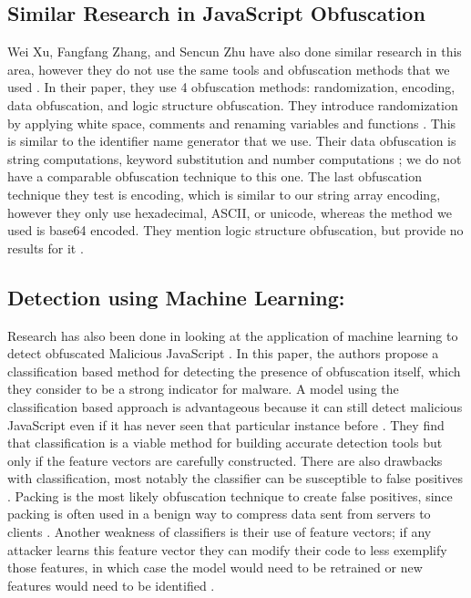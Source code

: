 \documentclass[sigplan,10pt,review, nonacm=true]{acmart}\settopmatter{printfolios=true,printccs=false,printacmref=false}
\begin{document}
\subsection{Similar Research in JavaScript Obfuscation}
Wei Xu, Fangfang Zhang, and Sencun Zhu have also done similar research in this area, however they do not use the same tools and obfuscation methods that we used \cite{XuZhang}. In their paper, they use 4 obfuscation methods: randomization, encoding, data obfuscation, and logic structure obfuscation.  They introduce randomization by applying white space, comments and renaming variables and functions \cite{XuZhang}. This is similar to the identifier name generator that we use. Their data obfuscation is string computations, keyword substitution and number computations \cite{XuZhang}; we do not have a comparable obfuscation technique to this one. The last obfuscation technique they test is encoding, which is similar to our string array encoding, however they only use hexadecimal, ASCII, or unicode, whereas the method we used is base64 encoded. They mention logic structure obfuscation, but provide no results for it \cite{XuZhang}.

\subsection{Detection using Machine Learning:}
Research has also been done in looking at the application of machine learning to detect obfuscated Malicious JavaScript \cite{Likarish}. In this paper, the authors propose a classification based method for detecting the presence of obfuscation itself, which they consider to be a strong indicator for malware. A model using the classification based approach is advantageous because it can still detect malicious JavaScript even if it has never seen that particular instance before \cite{Likarish}. They find that classification is a viable method for building accurate detection tools but only if the feature vectors are carefully constructed. There are also drawbacks with classification, most notably the classifier can be susceptible to false positives \cite{Likarish}. Packing is the most likely obfuscation technique to create false positives, since packing is often used in a benign way to compress data sent from servers to clients \cite{Likarish}. Another weakness of classifiers is their use of feature vectors; if any attacker learns this feature vector they can modify their code to less exemplify those features, in which case the model would need to be retrained or new features would need to be identified \cite{Likarish}.
\end{document}
